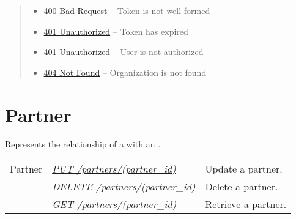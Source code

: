 \documentclass[letterpaper,10pt,english]{sphinxmanual}
\begin{document}
\begin{fulllineitems}
\begin{quote}
\begin{description}
\begin{itemize}
\item {} 
\href{http://www.w3.org/Protocols/rfc2616/rfc2616-sec10.html\#sec10.4.1}{400 Bad Request} -- Token is not well-formed

\item {} 
\href{http://www.w3.org/Protocols/rfc2616/rfc2616-sec10.html\#sec10.4.2}{401 Unauthorized} -- Token has expired

\item {} 
\href{http://www.w3.org/Protocols/rfc2616/rfc2616-sec10.html\#sec10.4.2}{401 Unauthorized} -- User is not authorized

\item {} 
\href{http://www.w3.org/Protocols/rfc2616/rfc2616-sec10.html\#sec10.4.5}{404 Not Found} -- Organization is not found

\end{itemize}

\end{description}\end{quote}

\end{fulllineitems}



\section{Partner}
\label{\detokenize{resources/partner::doc}}\label{\detokenize{resources/partner:partner}}\label{\detokenize{resources/partner:id1}}
Represents the relationship of a {\hyperref[\detokenize{resources/user:user}]{}} with an {\hyperref[\detokenize{resources/organization:organization}]{}}.

\noindent\begin{tabulary}{\linewidth}{|L|L|L|}
\hline
{}\relax &\relax &\relax \\
\hline
Partner
&
{\hyperref[\detokenize{resources/partner:put--partners-(partner_id)}]{\emph{PUT /partners/(partner\_id)}}}
&
Update a partner.
\\
\hline&
{\hyperref[\detokenize{resources/partner:delete--partners-(partner_id)}]{\emph{DELETE /partners/(partner\_id)}}}
&
Delete a partner.
\\
\hline&
{\hyperref[\detokenize{resources/partner:get--partners-(partner_id)}]{\emph{GET /partners/(partner\_id)}}}
&
Retrieve a partner.
\\
\hline\end{tabulary}
\end{document}
